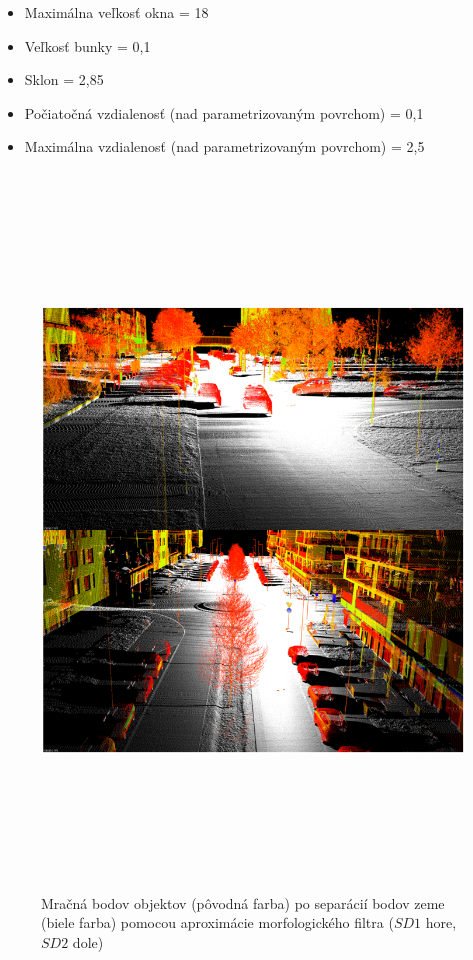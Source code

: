 \begin{itemize}
    \setlength\itemsep{0.2em}
    \item Maximálna veľkosť okna = 18
    \item Veľkosť bunky = 0,1
    \item Sklon = 2,85
    \item Počiatočná vzdialenosť (nad parametrizovaným povrchom) = 0,1
    \item Maximálna vzdialenosť (nad parametrizovaným povrchom) = 2,5
\end{itemize}

\newpage\vfill
\begin{figure}[ht]
  \centering
  \includegraphics[width=16cm, height=19cm]{img/morph_filter.png}
  \caption{Mračná bodov objektov (pôvodná farba) po separácií bodov zeme (biele farba) pomocou aproximácie morfologického filtra ($SD1$ hore, $SD2$ dole)} 
  \label{fig:ground_sep}
\end{figure} 
\vfill\clearpage

